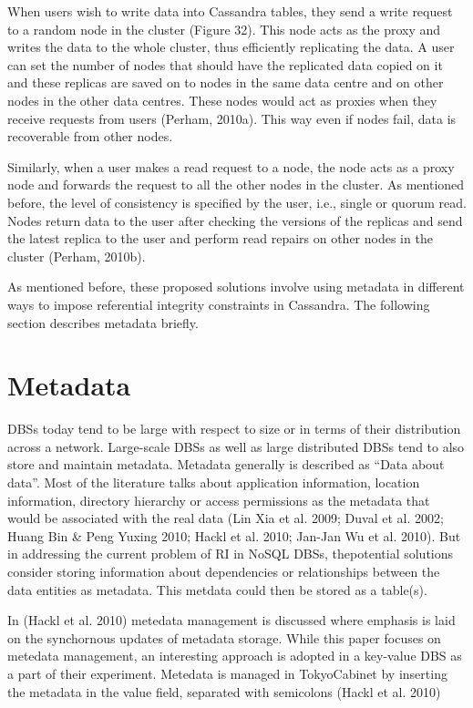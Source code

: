 When users wish to write data into Cassandra tables, they send a write request
to a random node in the cluster (Figure 32). This node acts as the proxy and
writes the data to the whole cluster, thus efficiently replicating the data.
A user can set the number of nodes that should have the
replicated data copied on it and these replicas are saved on to nodes in the
same data centre and on other nodes in the other data centres. These nodes would act
as proxies when they receive requests from users (Perham, 2010a). This way even
if nodes fail, data is recoverable from other nodes.

Similarly, when a user makes a read request to a node, the node acts as a proxy
node and forwards the request to all the other nodes in the cluster. As
mentioned before, the level of consistency is specified by the user, i.e.,
single or quorum read. Nodes return data to the user after checking the versions
of the replicas and send the latest replica to the user and perform read repairs
on other nodes in the cluster (Perham, 2010b).

As mentioned before, these proposed solutions involve using metadata in
different ways to impose referential integrity constraints in Cassandra. The
following section describes metadata briefly.


\section{Metadata}\label{s:metadata}
DBSs today tend to be large with respect to size or in terms of their
distribution across a network. Large-scale DBSs as well as large distributed
DBSs tend to also store and maintain metadata. Metadata generally is described
as ``Data about data''. Most of the literature talks about application
information, location information, directory hierarchy or access permissions as
the metadata that would be associated with the real data (Lin Xia et al. 2009;
Duval et al. 2002; Huang Bin \& Peng Yuxing 2010; Hackl et al. 2010; Jan-Jan Wu
et al. 2010). But in addressing the current problem of RI in NoSQL DBSs,
thepotential solutions consider storing information about dependencies or
relationships between the data entities as metadata. This metdata could then be
stored as a table(s).

In (Hackl et al. 2010) metedata management is discussed where emphasis is laid
on the synchornous updates of metadata storage. While this paper focuses on
metedata management, an interesting approach is adopted in a key-value DBS as a
part of their experiment. Metedata is managed in TokyoCabinet by inserting the
metadata in the value field, separated with semicolons (Hackl et al. 2010)

